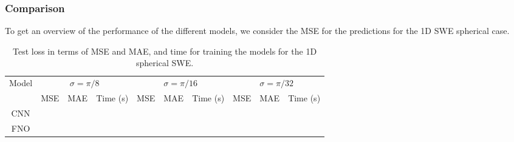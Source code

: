 \subsubsection*{Comparison}
To get an overview of the performance of the different models, we consider the MSE for the predictions for the 1D SWE spherical case.
\begin{table}[H]
    \centering
    \small %
    \begin{tabular}{c|ccc|ccc|ccc}
        \hline
        Model & \multicolumn{3}{c|}{$\sigma = \pi/8$} & \multicolumn{3}{c|}{$\sigma = \pi/16$} & \multicolumn{3}{c}{$\sigma = \pi/32$} \\
        \cline{2-10}
        & MSE & MAE & Time (s) & MSE & MAE & Time (s) & MSE & MAE & Time (s) \\
        \hline
        CNN & 
         &
         &
         &
         &
         &
         &
         &
         &
        
        \\ 
        \hline
        FNO & 
         &
         &
         &
         &
         &
         &
         &
         &
        
        \\ 
        \hline
    \end{tabular}
    \caption{Test loss in terms of MSE and MAE, and time for training the models for the 1D spherical SWE.}\label{tab:results_spherical_1D_comparison}
\end{table}
